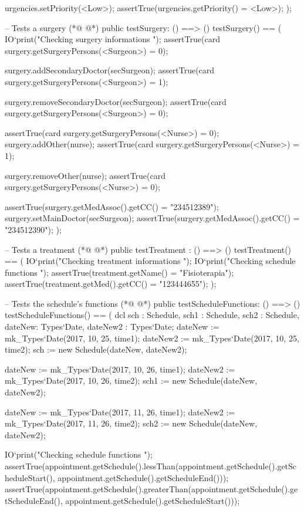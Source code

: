 \begin{vdmpp}[breaklines=true]
   urgencies.setPriority(<Low>);
   assertTrue(urgencies.getPriority() = <Low>);
  );
 
 -- Tests a surgery
(*@
\label{testSurgery:199}
@*)
 public testSurgery: () ==> ()
  testSurgery() == (
   IO`print("\n Checking surgery informations \n");
   assertTrue(card surgery.getSurgeryPersons(<Surgeon>) = 0);
   
   surgery.addSecondaryDoctor(secSurgeon);
   assertTrue(card surgery.getSurgeryPersons(<Surgeon>) = 1);
  
   surgery.removeSecondaryDoctor(secSurgeon);
   assertTrue(card surgery.getSurgeryPersons(<Surgeon>) = 0);
   
   assertTrue(card surgery.getSurgeryPersons(<Nurse>) = 0);
   surgery.addOther(nurse);
   assertTrue(card surgery.getSurgeryPersons(<Nurse>) = 1);
   
   surgery.removeOther(nurse);
   assertTrue(card surgery.getSurgeryPersons(<Nurse>) = 0);
   
   assertTrue(surgery.getMedAssoc().getCC() = "234512389");
   surgery.setMainDoctor(secSurgeon);
   assertTrue(surgery.getMedAssoc().getCC() = "234512390");
 );
 
 -- Tests a treatment
(*@
\label{testTreatment:223}
@*)
 public testTreatment : () ==> ()
  testTreatment() == (
   IO`print("\n Checking treatment informations \n");
   IO`print("\n Checking schedule functions \n");
   assertTrue(treatment.getName() = "Fisioterapia");
   assertTrue(treatment.getMed().getCC() = "123444655");
  );
  
  -- Tests the schedule's functions
(*@
\label{testScheduleFunctions:232}
@*)
  public testScheduleFunctions: () ==> ()
  testScheduleFunctions() == (
   dcl sch : Schedule, sch1 : Schedule, sch2 : Schedule, dateNew: Types`Date, dateNew2 : Types`Date;
   dateNew := mk_Types`Date(2017, 10, 25, time1);
   dateNew2 := mk_Types`Date(2017, 10, 25, time2);
   sch := new Schedule(dateNew, dateNew2);
   
   dateNew := mk_Types`Date(2017, 10, 26, time1);
   dateNew2 := mk_Types`Date(2017, 10, 26, time2);
   sch1 := new Schedule(dateNew, dateNew2);
   
   dateNew := mk_Types`Date(2017, 11, 26, time1);
   dateNew2 := mk_Types`Date(2017, 11, 26, time2);
   sch2 := new Schedule(dateNew, dateNew2);
   
   IO`print("\n Checking schedule functions \n");
   assertTrue(appointment.getSchedule().lessThan(appointment.getSchedule().getScheduleStart(), appointment.getSchedule().getScheduleEnd()));
   assertTrue(appointment.getSchedule().greaterThan(appointment.getSchedule().getScheduleEnd(), appointment.getSchedule().getScheduleStart()));
   

\end{vdmpp}
